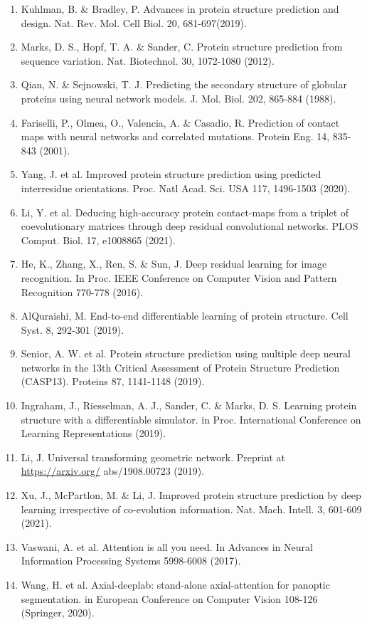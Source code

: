 \documentclass[10pt]{article}
\begin{document}
\begin{enumerate}
  \item Kuhlman, B. \& Bradley, P. Advances in protein structure prediction and design. Nat. Rev. Mol. Cell Biol. 20, 681-697(2019).
  \item Marks, D. S., Hopf, T. A. \& Sander, C. Protein structure prediction from sequence variation. Nat. Biotechnol. 30, 1072-1080 (2012).
  \item Qian, N. \& Sejnowski, T. J. Predicting the secondary structure of globular proteins using neural network models. J. Mol. Biol. 202, 865-884 (1988).
  \item Fariselli, P., Olmea, O., Valencia, A. \& Casadio, R. Prediction of contact maps with neural networks and correlated mutations. Protein Eng. 14, 835-843 (2001).
  \item Yang, J. et al. Improved protein structure prediction using predicted interresidue orientations. Proc. Natl Acad. Sci. USA 117, 1496-1503 (2020).
  \item Li, Y. et al. Deducing high-accuracy protein contact-maps from a triplet of coevolutionary matrices through deep residual convolutional networks. PLOS Comput. Biol. 17, e1008865 (2021).
  \item He, K., Zhang, X., Ren, S. \& Sun, J. Deep residual learning for image recognition. In Proc. IEEE Conference on Computer Vision and Pattern Recognition 770-778 (2016).
  \item AlQuraishi, M. End-to-end differentiable learning of protein structure. Cell Syst. 8, 292-301 (2019).
  \item Senior, A. W. et al. Protein structure prediction using multiple deep neural networks in the 13th Critical Assessment of Protein Structure Prediction (CASP13). Proteins 87, 1141-1148 (2019).
  \item Ingraham, J., Riesselman, A. J., Sander, C. \& Marks, D. S. Learning protein structure with a differentiable simulator. in Proc. International Conference on Learning Representations (2019).
  \item Li, J. Universal transforming geometric network. Preprint at \href{https://arxiv.org/}{https://arxiv.org/} abs/1908.00723 (2019).
  \item Xu, J., McPartlon, M. \& Li, J. Improved protein structure prediction by deep learning irrespective of co-evolution information. Nat. Mach. Intell. 3, 601-609 (2021).
  \item Vaswani, A. et al. Attention is all you need. In Advances in Neural Information Processing Systems 5998-6008 (2017).
  \item Wang, H. et al. Axial-deeplab: stand-alone axial-attention for panoptic segmentation. in European Conference on Computer Vision 108-126 (Springer, 2020).

\end{enumerate}
\end{document}
